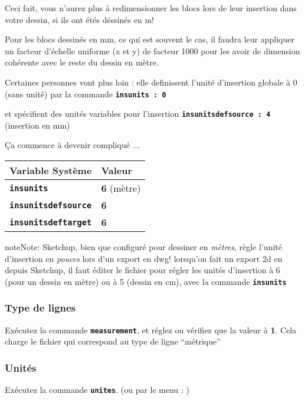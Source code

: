 \documentclass[a4paper,12pt,french]{sphinxmanual}
\begin{document}
Ceci fait, vous n'aurez plus à redimensionner les blocs lors de leur insertion dans votre dessin, si ils ont étés déssinés en m!

Pour les blocs dessinés en mm, ce qui est souvent le cas, il faudra leur appliquer un facteur d'échelle uniforme (x et y) de facteur 1000 pour les avoir de dimension cohérente avec le reste du dessin en mètre.

Certaines personnes vont plus loin : elle definissent l'unité d'insertion globale à 0 (sans unité) par la commande \textbf{\texttt{insunits : 0}}

et spécifient des unités variables pour l'insertion \textbf{\texttt{insunitsdefsource : 4}} (insertion en mm)

Ça commence à devenir compliqué ...

\noindent\begin{tabulary}{\linewidth}{|L|L|}
\hline

\textbf{Variable Système}
&
\textbf{Valeur}
\\
\hline
\textbf{\texttt{insunits}}
&
\textbf{6} (mètre)
\\
\hline
\textbf{\texttt{insunitsdefsource}}
&
\textbf{6}
\\
\hline
\textbf{\texttt{insunitsdeftarget}}
&
\textbf{6}
\\
\hline\end{tabulary}


\begin{notice}{note}{Note:}
Sketchup, bien que configuré pour dessiner en \emph{mètres}, règle l'unité d'insertion en \emph{pouces} lors d'un export en dwg! lorsqu'on fait un export 2d en  depuis Sketchup, il faut éditer le fichier pour régler les unités d'insertion à 6 (pour un dessin en mètre) ou à 5 (dessin en cm), avec la commande \textbf{\texttt{insunits}}
\end{notice}


\subsubsection{Type de lignes}
\label{acad/config_acad:type-de-lignes}
Exécutez la commande \textbf{\texttt{measurement}}, et réglez ou vérifiez que la valeur à \textbf{1}. Cela charge le fichier  qui correspond au type de ligne ``métrique''


\subsubsection{Unités}
\label{acad/config_acad:unites}
Exécutez la commande \textbf{\texttt{unites}}. (ou par le menu :  )
\end{document}
